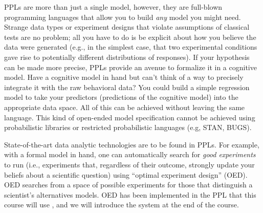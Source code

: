 \documentclass[10pt,letterpaper]{article}
\begin{document}
PPLs are more than just a single model, however, they are full-blown programming languages that allow you to build \emph{any} model you might need.
Strange data types or experiment designs that violate assumptions of classical tests are no problem; all you have to do is be explicit about how you believe the data were generated (e.g., in the simplest case, that two experimental conditions gave rise to potentially different distributions of responses).
If your hypothesis can be made more precise, PPLs provide an avenue to formalize it in a cognitive model. 
Have a cognitive model in hand but can't think of a way to precisely integrate it with the raw behavioral data? 
You could build a simple regression model to take your predictors (predictions of the cognitive model) into the appropriate data space.
All of this can be achieved without leaving the same language.
This kind of open-ended model specification cannot be achieved using probabilistic libraries or restricted probabilistic languages (e.g, STAN, BUGS). 

State-of-the-art data analytic technologies are to be found in PPLs. 
For example, with a formal model in hand, one can automatically search for \emph{good experiments} to run (i.e., experiments that, regardless of their outcome, strongly update your beliefs about a scientific question) using ``optimal experiment design'' (OED).
OED searches from a space of possible experiments for those that distinguish a scientist's alternatives models.
OED has been implemented in the PPL that this course will use \cite{ouyangArxivOED}, and we will introduce the system at the end of the course.

%
%

\end{document}
